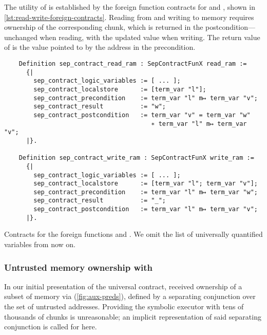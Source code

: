 The utility of  is established by the foreign function contracts for  and , shown in \cref{lst:read-write-foreign-contracts}. Reading from and writing to memory requires ownership of the corresponding  chunk, which is returned in the postcondition---unchanged when reading, with the updated value when writing. The return value of  is the value pointed to by the address in the precondition.

\begin{listing}[htb]
  \begin{verbatim}
    Definition sep_contract_read_ram : SepContractFunX read_ram :=
      {|
        sep_contract_logic_variables := [ ... ];
        sep_contract_localstore      := [term_var "l"];
        sep_contract_precondition    := term_var "l" m↦ term_var "v";
        sep_contract_result          := "w";
        sep_contract_postcondition   := term_var "v" = term_var "w"
                                        ∗ term_var "l" m↦ term_var "v";
      |}.

    Definition sep_contract_write_ram : SepContractFunX write_ram :=
      {|
        sep_contract_logic_variables := [ ... ];
        sep_contract_localstore      := [term_var "l"; term_var "v"];
        sep_contract_precondition    := term_var "l" m↦ term_var "w";
        sep_contract_result          := "_";
        sep_contract_postcondition   := term_var "l" m↦ term_var "v";
      |}.
  \end{verbatim}
  \caption{Contracts for the foreign functions  and . We omit the list of universally quantified variables from now on.}
  \label{lst:read-write-foreign-contracts}
\end{listing}

\subsubsection{Untrusted memory ownership with }

In our initial presentation of the universal contract,  received ownership of a subset of memory via  (\cref{fig:aux-preds}), defined by a separating conjunction over the set of untrusted addresses. Providing the symbolic executor with tens of thousands of  chunks is unreasonable; an implicit representation of said separating conjunction is called for here.

